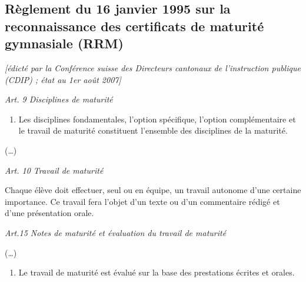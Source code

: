\documentclass[
  10pt,
  french,
  a5paper,
  openany]{book}
\providecommand{\tightlist}{%
  \setlength{\itemsep}{0pt}\setlength{\parskip}{0pt}}
\begin{document}
\hypertarget{ruxe8glement-du-16-janvier-1995-sur-la-reconnaissance-des-certificats-de-maturituxe9-gymnasiale-rrm}{%
\subsection*{Règlement du 16 janvier 1995 sur la reconnaissance des certificats de maturité gymnasiale (RRM)}\label{ruxe8glement-du-16-janvier-1995-sur-la-reconnaissance-des-certificats-de-maturituxe9-gymnasiale-rrm}}

\emph{{[}édicté par la Conférence suisse des Directeurs cantonaux de l'instruction publique (CDIP) ; état au 1er août 2007{]}}


\emph{Art. 9 Disciplines de maturité}

\begin{enumerate}
\def\labelenumi{\arabic{enumi}.}
\tightlist
\item
  Les disciplines fondamentales, l'option spécifique, l'option complémentaire et le travail de maturité constituent l'ensemble des disciplines de la maturité.
\end{enumerate}

(\ldots)


\emph{Art. 10 Travail de maturité}

Chaque élève doit effectuer, seul ou en équipe, un travail autonome d'une certaine importance. Ce travail fera l'objet d'un texte ou d'un commentaire rédigé et d'une présentation orale.


\emph{Art.15 Notes de maturité et évaluation du travail de maturité}

(\ldots)

\begin{enumerate}
\def\labelenumi{\arabic{enumi}.}
\setcounter{enumi}{1}
\tightlist
\item
  Le travail de maturité est évalué sur la base des prestations écrites et orales.
\end{enumerate}


\clearpage
\end{document}
